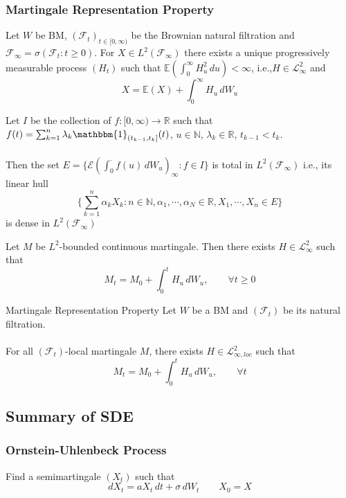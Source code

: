 \documentclass[12pt,a4paper]{article}
\newcommand{\R}{\mathbb{R}}
\newcommand{\N}{\mathbb{N}}
\newcommand{\E}{\mathbb{E}}
\begin{document}
    \subsubsection{Martingale Representation Property}
    \begin{proposition}{}{}
        Let $W$ be BM, $(\mathscr{F}_t)_{t\in[0,\infty)}$ be the Brownian natural filtration and $\mathscr{F}_\infty = \sigma(\mathscr{F}_t:t\ge 0)$. For $X\in L^2(\mathscr{F}_\infty)$ there exists a unique progressively measurable process $(H_t)$ such that $\E\left(\int_0^\infty H_u^2 \, du\right)<\infty$, i.e.,$H\in\mathcal{L}^2_\infty$ and
        $$
        X = \E(X) + \int_0^\infty H_u\,dW_u
        $$
        \begin{lemma}{}{}
            Let $I$ be the collection of $f:[0,\infty)\to \R$ such that $f(t) = \sum_{k=1}^n\lambda_k\mathbbm{1}_{(t_{k-1},t_k]}(t)$, $u\in\N$, $\lambda_k\in \R$, $t_{k-1}<t_k$.\\
            \\
            Then the set $E = \{\mathcal{E}(\int_0^\cdot f(u)\, dW_u)_\infty: f\in I\}$ is total in $L^2(\mathscr{F}_\infty)$ i.e., its linear hull
            $$
            \{\sum_{k=1}^n\alpha_k X_k: n\in\N, \alpha_1,\cdots,\alpha_N\in\R, X_1,\cdots,X_n\in E\}
            $$
            is dense in $L^2(\mathscr{F}_\infty)$
        \end{lemma}
    \end{proposition}
    \begin{corollary}{}{}
        Let $M$ be $L^2$-bounded continuous martingale. Then there exists $H\in\mathcal{L}^2_\infty$ such that
        $$
        M_t = M_0 + \int_0^t H_u\, dW_u,\qquad \forall t\ge 0
        $$
    \end{corollary}
    \begin{theorem}{Martingale Representation Property}{}
        Let $W$ be a BM and $(\mathscr{F}_t)$ be its natural filtration.\\
        \\
        For all $(\mathscr{F}_t)$-local martingale $M$, there exists $H\in\mathcal{L}^2_{\infty,loc}$ such that
        $$
        M_t = M_0 + \int_0^t H_u\, dW_u,\qquad \forall t
        $$
    \end{theorem}
    \pagebreak
    \subsection{Summary of SDE}
    \subsubsection{Ornstein-Uhlenbeck Process}
    Find a semimartingale $(X_t)$ such that
    $$
    dX_t = aX_t\, dt + \sigma\,dW_t\qquad X_0=X
    $$
\end{document}

